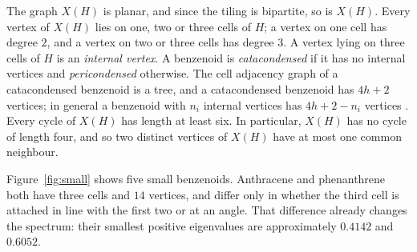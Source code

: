 \documentclass[11pt]{article}
\theoremstyle{definition}
\begin{document}
The graph $X(H)$ is planar, and since the tiling is bipartite, so is $X(H)$.
Every vertex of $X(H)$ lies on one, two or three cells of $H$; a vertex on
one cell has degree $2$, and a vertex on two or three cells has degree $3$.
A vertex lying on three cells of $H$ is an \textsl{internal vertex}.  A
benzenoid is \textsl{catacondensed} if it has no internal vertices and
\textsl{pericondensed} otherwise.  The cell adjacency graph of a
catacondensed benzenoid is a tree, and a catacondensed benzenoid has $4h+2$
vertices; in general a benzenoid with $n_i$ internal vertices has $4h+2-n_i$
vertices \cite{GutCyv1989}.  Every cycle of $X(H)$ has length at least six.  In
particular, $X(H)$ has no cycle of length four, and so two distinct vertices
of $X(H)$ have at most one common neighbour.

Figure~\ref{fig:small} shows five small benzenoids.  Anthracene and
phenanthrene both have three cells and $14$ vertices, and differ only in
whether the third cell is attached in line with the first two or at an angle.
That difference already changes the spectrum: their smallest positive
eigenvalues are approximately $0.4142$ and $0.6052$.
\end{document}
